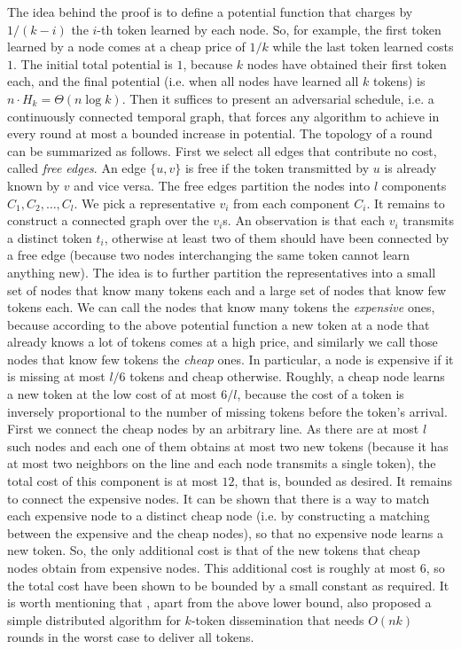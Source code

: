 \documentclass[oribibl, 11pt]{llncs}
\begin{document}
The idea behind the proof is to define a potential function that charges by $1/(k-i)$ the $i$-th token learned by each node. So, for example, the first token learned by a node comes at a cheap price of $1/k$ while the last token learned costs $1$. The initial total potential is $1$, because $k$ nodes have obtained their first token each, and the final potential (i.e. when all nodes have learned all $k$ tokens) is $n\cdot H_k=\Theta(n\log k)$. Then it suffices to present an adversarial schedule, i.e. a continuously connected temporal graph, that forces any algorithm to achieve in every round at most a bounded increase in potential. The topology of a round can be summarized as follows. First we select all edges that contribute no cost, called \emph{free edges}. An edge $\{u,v\}$ is free if the token transmitted by $u$ is already known by $v$ and vice versa. The free edges partition the nodes into $l$ components $C_1,C_2,\ldots,C_l$. We pick a representative $v_i$ from each component $C_i$. It remains to construct a connected graph over the $v_i$s. An observation is that each $v_i$ transmits a distinct token $t_i$, otherwise at least two of them should have been connected by a free edge (because two nodes interchanging the same token cannot learn anything new). The idea is to further partition the representatives into a small set of nodes that know many tokens each and a large set of nodes that know few tokens each. We can call the nodes that know many tokens the \emph{expensive} ones, because according to the above potential function a new token at a node that already knows a lot of tokens comes at a high price, and similarly we call those nodes that know few tokens the \emph{cheap} ones. In particular, a node is expensive if it is missing at most $l/6$ tokens and cheap otherwise. Roughly, a cheap node learns a new token at the low cost of at most $6/l$, because the cost of a token is inversely proportional to the number of missing tokens before the token's arrival. First we connect the cheap nodes by an arbitrary line. As there are at most $l$ such nodes and each one of them obtains at most two new tokens (because it has at most two neighbors on the line and each node transmits a single token), the total cost of this component is at most $12$, that is, bounded as desired. It remains to connect the expensive nodes. It can be shown that there is a way to match each expensive node to a distinct cheap node (i.e. by constructing a matching between the expensive and the cheap nodes), so that no expensive node learns a new token. So, the only additional cost is that of the new tokens that cheap nodes obtain from expensive nodes. This additional cost is roughly at most $6$, so the total cost have been shown to be bounded by a small constant as required. It is worth mentioning that \cite{KLO10}, apart from the above lower bound, also proposed a simple distributed algorithm for $k$-token dissemination that needs $O(nk)$ rounds in the worst case to deliver all tokens.
\end{document}
